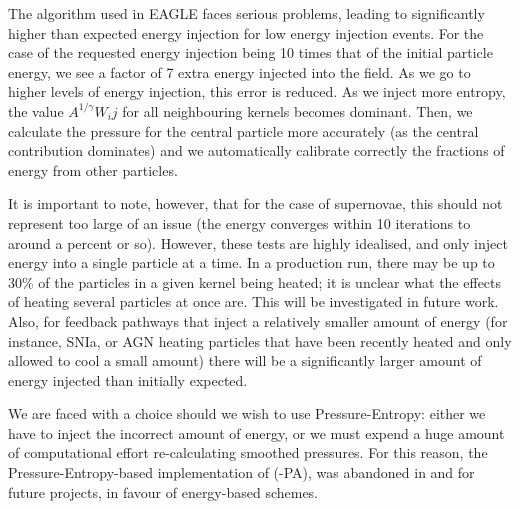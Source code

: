 The algorithm used in EAGLE faces serious problems, leading to significantly
higher than expected energy injection for low energy injection events. For
the case of the requested energy injection being 10 times that of the initial
particle energy, we see a factor of 7 extra energy injected into the field.
As we go to higher levels of energy injection, this error is reduced. As we
inject more entropy, the value $A^{1/\gamma} W_ij$ for all neighbouring
kernels becomes dominant. Then, we calculate the pressure for the central
particle more accurately (as the central contribution dominates) and we
automatically calibrate correctly the fractions of energy from other
particles.

It is important to note, however, that for the case of \eagle{} supernovae,
this should not represent too large of an issue (the energy converges within
10 iterations to around a percent or so). However, these tests are highly
idealised, and only inject energy into a single particle at a time. In a
production run, there may be up to 30\% of the particles in a given kernel
being heated; it is unclear what the effects of heating several particles at
once are. This will be investigated in future work. Also, for feedback
pathways that inject a relatively smaller amount of energy (for instance,
SNIa, or AGN heating particles that have been recently heated and only
allowed to cool a small amount) there will be a significantly larger amount
of energy injected than initially expected.

We are faced with a choice should we wish to use Pressure-Entropy: either we
have to inject the incorrect amount of energy, or we must expend a huge
amount of computational effort re-calculating smoothed pressures. For this reason,
the Pressure-Entropy-based implementation of \anarchy{} (\anarchy{}-PA), was
abandoned in \swift{} and for future \eagle{} projects, in favour of
energy-based schemes.
